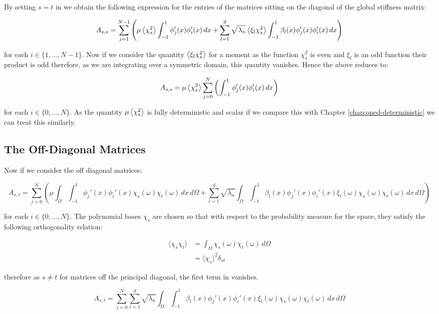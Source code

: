 By setting $s=t$ in  we obtain the following
expression for the entries of the matrices sitting on the diagonal of the
global stiffness matrix:

\begin{equation}
    A_{s,s} = \sum_{j=1}^{N-1}\left(\mu\left\langle\chi_s^2\right\rangle
        \int_{-1}^1 \phi_j'(x)\phi_i'(x)\, dx
       + \sum_{l=1}^d\sqrt{\lambda_n}\left\langle\xi_l\chi_s^2\right\rangle
       \int_{-1}^1 \beta_l(x)\phi_j'(x)\phi_i'(x) \, dx\right)
\end{equation}

for each $i \in \{1,\ldots,N-1\}$. Now if we consider the quantity
$\left\langle\xi_l\chi_s^2\right\rangle$ for a moment as the function $\chi_s^2$ is even and
$\xi_l$ is an odd function their product is odd therefore, as we are integrating
over a symmetric domain, this quantity vanishes. Hence the above reduces to:

\begin{equation}
    A_{s,s} = \mu\left\langle\chi_s^2\right\rangle\sum_{j=0}^N\left(\int_{-1}^1
                \phi_j'(x)\phi_i'(x)\, dx\right)
\end{equation}

for each $i \in \{0,\ldots,N\}$. As the quantity $\mu\left\langle\chi_s^2\right\rangle$ is
fully deterministic and scalar if we compare this with Chapter
\ref{chap:oned-deterministic} we can treat this similarly.

\subsection{The Off-Diagonal Matrices}

Now if we consider the off diagonal matrices:

\begin{equation}\label{eq:oned-stochastic-off-diagonal-stiffness}
    A_{s,t} = \sum_{j=0}^N\left(\mu\int_\Omega\int_{-1}^1
       \phi_j'(x)\phi_i'(x)\chi_s(\omega)\chi_t(\omega)\, dx\, d\Omega
       + \sum_{l=1}^d\sqrt{\lambda_n}\int_\Omega\int_{-1}^1
    \beta_l(x)\phi_j'(x)\phi_i'(x)\xi_l(\omega)\chi_s(\omega)\chi_t(\omega)
       \, dx\, d\Omega  \right)
\end{equation}

for each $i \in \{0,\ldots,N\}$. The polynomial bases $\chi_s$ are chosen so
that with respect to the probability measure for the space, they satisfy the
following orthogonality relation:

\begin{align*}
    \langle\chi_s\chi_t\rangle
      &= \int_\Omega\chi_s(\omega)\chi_t(\omega)\, d\Omega \\
      &= \langle\chi_s\rangle^2\delta_{st}
\end{align*}

therefore as $s \neq t$ for matrices off the principal diagonal, the first term
in  vanishes.


\begin{equation}
    A_{s,t} = \sum_{j=0}^N
        \sum_{l=1}^d\sqrt{\lambda_n}\int_\Omega\int_{-1}^1
       \beta_l(x)\phi_j'(x)\phi_i'(x)\xi_l(\omega)\chi_s(\omega)\chi_t(\omega)
       \, dx\, d\Omega
\end{equation}

